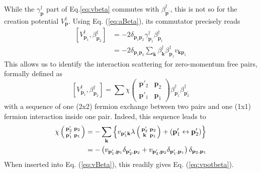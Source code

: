 \documentclass[aps,prb,superscriptaddress,showpacs,reprint,lengthcheck]{revtex4}
\newcommand{\vk}{\ensuremath{\mathbf{k}}}
\newcommand{\vp}{\ensuremath{\mathbf{p}}}
\begin{document}
While the $\gamma^{\dagger}_\vp$ part of Eq.\eqref{eq:vbeta} 
commutes with $%
\beta^{\dagger}_{\vp ^\prime}$, 
this is not so for the creation potential $%
V^{\dagger}_\vp$. Using Eq. (\ref{eq:aBeta}), its commutator precisely reads 
\begin{equation}\begin{split}  \label{eq:vpotbeta}
\left[V^{\dagger}_{\mathbf{p} _1},\beta^{\dagger}_{\mathbf{p} _2}\right] 
&=-2\delta_{\mathbf{p} _1\mathbf{p} _2}\gamma^{\dagger}_{\mathbf{p}
_1}\beta^{\dagger}_{\mathbf{p} _1}\\
&=-2\delta_{\mathbf{p} _1\mathbf{p} _2}\sum_\mathbf{k}\beta^{\dagger}_{\mathbf{k}}\beta^{\dagger}_{\mathbf{p} _1}v_{\mathbf{k}\mathbf{p} _1}
\end{split}\end{equation}
This allows us to identify the interaction scattering for zero-momentum free pairs,
formally defined as \cite{CobosonPhysicsReports}
\begin{equation}  \label{eq:vBeta}
\left[V^{\dagger}_{\mathbf{p} _1},\beta^{\dagger}_{\mathbf{p} _2}\right] 
=\sum\chi\left(\begin{smallmatrix}\vp'_2&\vp_2\\\vp'_1&\vp_1\end{smallmatrix}%
\right)  \beta^{\dagger}_{\mathbf{p} ^{\prime}_1}\beta^{\dagger}_{\mathbf{p}
^{\prime}_2}
\end{equation}
with a sequence of one (2x2) fermion exchange between two pairs and one (1x1) fermion interaction inside one pair. Indeed, this sequence leads to
\begin{equation}  \label{eq:interactSc}
\begin{split}
\chi\left(\begin{smallmatrix}\vp'_2&\vp_2\\\vp'_1&\vp_1\end{smallmatrix}%
\right)  &=-\sum_\vk\left\{v_{\mathbf{p} ^{\prime}_1\mathbf{k} }\lambda\left(%
\begin{smallmatrix}\vp'_2&\vp_2\\\vk&\vp_1\end{smallmatrix}\right)  +\left(%
\mathbf{p} ^{\prime}_1\leftrightarrow\mathbf{p} ^{\prime}_2\right) \right\} 
\\
&=-\left(v_{\mathbf{p} ^{\prime}_1,\mathbf{p} _1}\delta_{\mathbf{p}
^{\prime}_2,\mathbf{p} _2}+v_{\mathbf{p} ^{\prime}_2,\mathbf{p} _2}\delta_{%
\mathbf{p} ^{\prime}_1,\mathbf{p} _1}\right) \delta_{\mathbf{p} _2,\mathbf{p}
_1}
\end{split}%
\end{equation}
When inserted into Eq. (\ref{eq:vBeta}), this readily gives Eq. (\ref{eq:vpotbeta}). 
\end{document}
